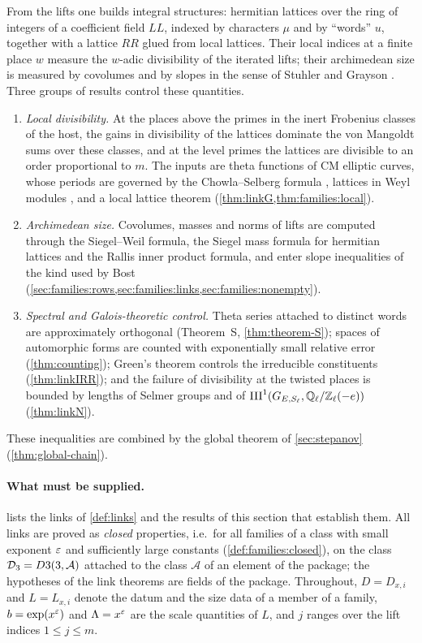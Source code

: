 From the lifts one builds integral structures: hermitian lattices over the ring of integers of a coefficient
field $\mathit{LL}$, indexed by characters $\mu$ and by ``words'' $u$, together with a lattice
$\mathit{RR}$ glued from local lattices. Their local indices at a finite place $w$ measure the $w$-adic
divisibility of the iterated lifts; their archimedean size is measured by covolumes and by slopes in the sense
of Stuhler and Grayson \cite{Stuhler1976,Grayson1984}. Three groups of results control these quantities.
\begin{enumerate}[label=(\alph*)]
\item \emph{Local divisibility.} At the places above the primes in the inert Frobenius classes of the host,
the gains in divisibility of the lattices dominate the von Mangoldt sums over these classes, and at the level
primes the lattices are divisible to an order proportional to $m$. The inputs are theta functions of CM
elliptic curves, whose periods are governed by the Chowla--Selberg formula \cite{ChowlaSelberg1967}, lattices in
Weyl modules \cite{Weyl1946}, and a local lattice theorem (\cref{thm:linkG,thm:families:local}).
\item \emph{Archimedean size.} Covolumes, masses and norms of lifts are computed through the Siegel--Weil
formula, the Siegel mass formula for hermitian lattices and the Rallis inner product formula, and enter slope
inequalities of the kind used by Bost \cite{Bost1996,Bost2001} (\cref{sec:families:rows,sec:families:links,sec:families:nonempty}).
\item \emph{Spectral and Galois-theoretic control.} Theta series attached to distinct words are approximately
orthogonal (Theorem~S, \cref{thm:theorem-S}); spaces of automorphic forms are counted with exponentially small
relative error (\cref{thm:counting}); Green's theorem controls the irreducible constituents
(\cref{thm:linkIRR}); and the failure of divisibility at the twisted places is bounded by lengths of Selmer
groups and of $\mathrm{III}^1(G_{E,S_\ell},\mathbb{Q}_\ell/\mathbb{Z}_\ell(-e))$ (\cref{thm:linkN}).
\end{enumerate}
These inequalities are combined by the global theorem of \cref{sec:stepanov} (\cref{thm:global-chain}).

\paragraph{What must be supplied.}
 lists the links of \cref{def:links} and the results of this section that establish
them. All links are proved as \emph{closed} properties, i.e.\ for all families of a class with small exponent
$\varepsilon$ and sufficiently large constants (\cref{def:families:closed}), on the class
$\mathcal{D}_3=D3(3,\mathcal A)$ attached to the class $\mathcal A$ of an element of the package; the
hypotheses of the link theorems are fields of the package. Throughout, $D=D_{x,i}$ and $L=L_{x,i}$ denote the
datum and the size data of a member of a family, $b=\exp(x^\varepsilon)$ and $\Lambda=x^\varepsilon$ are the scale quantities
of $L$, and $j$ ranges over the lift indices $1\le j\le m$.

